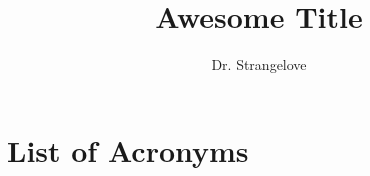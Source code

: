 \documentclass[]{report}
\title{Awesome Title}
\author{Dr. Strangelove}
\begin{document}
\maketitle
\section*{List of Acronyms}





\scriptsize

\end{document}
